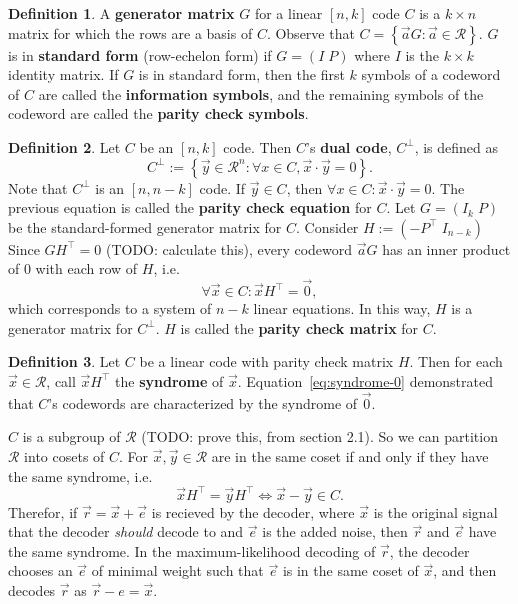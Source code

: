 \documentclass{article}
\newcommand{\calR}{\mathcal{R}}
\newcommand{\dual}[1]{#1^\bot}
\newcommand{\trans}[1]{#1^\top}
\renewcommand{\=}{\equiv}
\newcommand{\set}[1]{\left\{ #1 \right\}}
\renewcommand{\v}{\vec}
\newcommand{\x}{{\v x}}
\newcommand{\y}{{\v y}}
\theoremstyle{plain}
\theoremstyle{definition}
\newtheorem{defn}{Definition}[subsection]
\newcommand{\TODO}[1]{(TODO: #1)}
\begin{document}
\begin{defn}
A \textbf{generator matrix} $G$ for a linear $[n,k]$ code $C$ is a $k \times n$ matrix for which the rows are a basis of $C$.
Observe that $C = \set{ \v a G : \v a \in \calR }$.
$G$ is in \textbf{standard form} (row-echelon form) if $G = (I \; P)$ where $I$ is the $k \times k$ identity matrix.
If $G$ is in standard form, then the first $k$ symbols of a codeword of $C$ are called the \textbf{information symbols}, and the remaining symbols of the codeword are called the \textbf{parity check symbols}.
\end{defn}

\begin{defn}
Let $C$ be an $[n,k]$ code. Then $C$'s \textbf{dual code}, $\dual C$, is defined as
$$ \dual C := \set{ \y \in \calR^n : \forall x \in C, \x \cdot \y = 0 }. $$
Note that $\dual C$ is an $[n, n-k]$ code.
If $\y \in C$, then $\forall x \in C : \x \cdot \y = 0$. The previous equation is called the \textbf{parity check equation} for $C$.
Let $G = (I_k \; P)$ be the standard-formed generator matrix for $C$.
Consider $H := (-\trans P \; I_{n-k})$
Since $G \trans H = 0$ \TODO{calculate this}, every codeword $\v a G$ has an inner product of 0 with each row of $H$, i.e.
\begin{equation}
  \label{eq:syndrome-0}
  \forall \x \in C : \x \trans H = \v 0,
\end{equation}
which corresponds to a system of $n-k$ linear equations.
In this way, $H$ is a generator matrix for $\dual C$.
$H$ is called the \textbf{parity check matrix} for $C$.
\end{defn}

\begin{defn}
Let $C$ be a linear code with parity check matrix $H$.
Then for each $\v x \in \calR$, call $\x \trans H$ the \textbf{syndrome} of $\x$.
Equation~\ref{eq:syndrome-0} demonstrated that $C$'s codewords are characterized by the syndrome of $\v 0$.

$C$ is a subgroup of $\calR$ \TODO{prove this, from section 2.1}.
So we can partition $\calR$ into cosets of $C$.
For $\x, \y \in \calR$ are in the same coset if and only if they have the same syndrome, i.e.
$$ \x \trans H = \y \trans H \iff \x - \y \in C. $$
Therefor, if $\v r = \x + \v e$ is recieved by the decoder, where $\x$ is the original signal that the decoder \textit{should} decode to and $\v e$ is the added noise, then $\v r$ and $\v e$ have the same syndrome.
In the maximum-likelihood decoding of $\v r$, the decoder chooses an $\v e$ of minimal weight such that $\v e$ is in the same coset of $\x$, and then decodes $\v r$ as $\v r - e = \v x$.
\end{defn}
\end{document}
